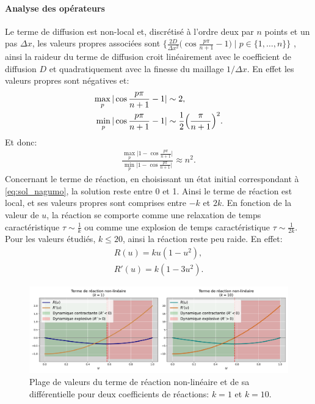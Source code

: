 \paragraph{Analyse des opérateurs}\label{par:analyser_operateurs_nagumo}
Le terme de diffusion est non-local et, discrétisé à l'ordre deux par $n$ points et un pas $\Delta x$, les valeurs propres associées sont 
$\{ \frac{2D}{\Delta x^2} \bigl(\cos \frac{p\pi}{n+1} - 1\bigr) \mid p \in \{1,\dots,n\}\}$ \cite{bouchet2020laplacien}, 
ainsi la raideur du terme de diffusion croit linéairement avec le coefficient de diffusion $D$ et quadratiquement avec la finesse du maillage $1/\Delta x$.
En effet les valeurs propres sont négatives et:
\begin{align}
    \max_p \vert\cos \frac{p\pi}{n+1} - 1 \vert &\sim 2,\\
    \min_p \vert \cos \frac{p\pi}{n+1} - 1 \vert &\sim \frac{1}{2}\Bigl( \frac{\pi}{n+1} \Bigr)^2.
\end{align}
Et donc:
\begin{align}
    \frac{\max_p \vert 1 - \cos \frac{p\pi}{n+1} \vert}{\min_p \vert 1 - \cos \frac{p\pi}{n+1} \vert} \approx n^2.
\end{align}
Concernant le terme de réaction, en choisissant un état initial correspondant à \ref{eq:sol_nagumo},
la solution reste entre 0 et 1. Ainsi le terme de réaction est local, et ses valeurs propres sont comprises entre $-k$ et $2k$.
En fonction de la valeur de $u$, la réaction se comporte comme une relaxation de temps caractéristique $\tau \sim \frac{1}{k}$ ou comme une explosion de temps 
caractéristique $\tau \sim \frac{1}{2k}$. Pour les valeurs étudiés, $k \leq 20$, ainsi la réaction reste peu raide.
En effet: 
\begin{align}
    R(u) = ku(1-u^2),\\
    R'(u) = k (1 - 3u^2).
\end{align}

\begin{figure}[htbp]
    \centering
    \includegraphics[width=\textwidth]{media/4_travail/2_nagumo/raideur_reaction_nagumo.pdf}
    \caption{Plage de valeurs du terme de réaction non-linéaire et de sa différentielle pour deux coefficients de réactions: $k=1$ et $k=10$.}
    \label{fig:raideur_reaction_nagumo}
\end{figure}

